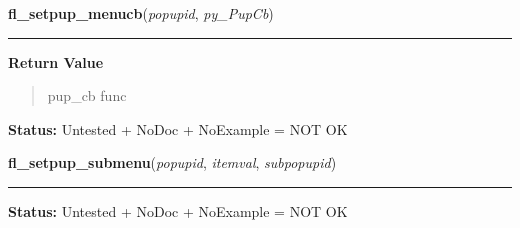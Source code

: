     \label{xformslib:library:fl_setpup_menucb}

    \vspace{0.5ex}

\hspace{.8\funcindent}\begin{boxedminipage}{\funcwidth}

    \raggedright \textbf{fl\_setpup\_menucb}(\textit{popupid}, \textit{py\_PupCb})

    \vspace{-1.5ex}

    \rule{\textwidth}{0.5\fboxrule}
\setlength{\parskip}{2ex}
\setlength{\parskip}{1ex}
      \textbf{Return Value}
    \vspace{-1ex}

      \begin{quote}
      pup\_cb func

      \end{quote}

\textbf{Status:} Untested + NoDoc + NoExample = NOT OK



    \end{boxedminipage}

    \label{xformslib:library:fl_setpup_submenu}

    \vspace{0.5ex}

\hspace{.8\funcindent}\begin{boxedminipage}{\funcwidth}

    \raggedright \textbf{fl\_setpup\_submenu}(\textit{popupid}, \textit{itemval}, \textit{subpopupid})

    \vspace{-1.5ex}

    \rule{\textwidth}{0.5\fboxrule}
\setlength{\parskip}{2ex}
\setlength{\parskip}{1ex}
\textbf{Status:} Untested + NoDoc + NoExample = NOT OK



    \end{boxedminipage}

    \label{xformslib:library:fl_setpup_mode}

